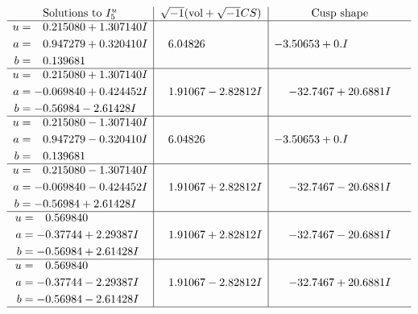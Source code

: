 \documentclass[1p]{elsarticle_modified}
\theoremstyle{definition}
\newcommand{\I}{\sqrt{-1}}
\begin{document}
$$\begin{array}{c|c|c}  
\text{Solutions to }I^u_{5}& \I (\text{vol} + \sqrt{-1}CS) & \text{Cusp shape}\\
 \hline 
\begin{aligned}
u &= \phantom{-}0.215080 + 1.307140 I \\
a &= \phantom{-}0.947279 + 0.320410 I \\
b &= \phantom{-}0.139681\phantom{ +0.000000I}\end{aligned}
 & \phantom{-}6.04826\phantom{ +0.000000I} & -3.50653 + 0. I\phantom{ +0.000000I} \\ \hline\begin{aligned}
u &= \phantom{-}0.215080 + 1.307140 I \\
a &= -0.069840 + 0.424452 I \\
b &= -0.56984 - 2.61428 I\end{aligned}
 & \phantom{-}1.91067 - 2.82812 I & -32.7467 + 20.6881 I \\ \hline\begin{aligned}
u &= \phantom{-}0.215080 - 1.307140 I \\
a &= \phantom{-}0.947279 - 0.320410 I \\
b &= \phantom{-}0.139681\phantom{ +0.000000I}\end{aligned}
 & \phantom{-}6.04826\phantom{ +0.000000I} & -3.50653 + 0. I\phantom{ +0.000000I} \\ \hline\begin{aligned}
u &= \phantom{-}0.215080 - 1.307140 I \\
a &= -0.069840 - 0.424452 I \\
b &= -0.56984 + 2.61428 I\end{aligned}
 & \phantom{-}1.91067 + 2.82812 I & -32.7467 - 20.6881 I \\ \hline\begin{aligned}
u &= \phantom{-}0.569840\phantom{ +0.000000I} \\
a &= -0.37744 + 2.29387 I \\
b &= -0.56984 + 2.61428 I\end{aligned}
 & \phantom{-}1.91067 + 2.82812 I & -32.7467 - 20.6881 I \\ \hline\begin{aligned}
u &= \phantom{-}0.569840\phantom{ +0.000000I} \\
a &= -0.37744 - 2.29387 I \\
b &= -0.56984 - 2.61428 I\end{aligned}
 & \phantom{-}1.91067 - 2.82812 I & -32.7467 + 20.6881 I\\
 \hline 
 \end{array}$$\newpage\newpage\renewcommand{\arraystretch}{1}
\end{document}
